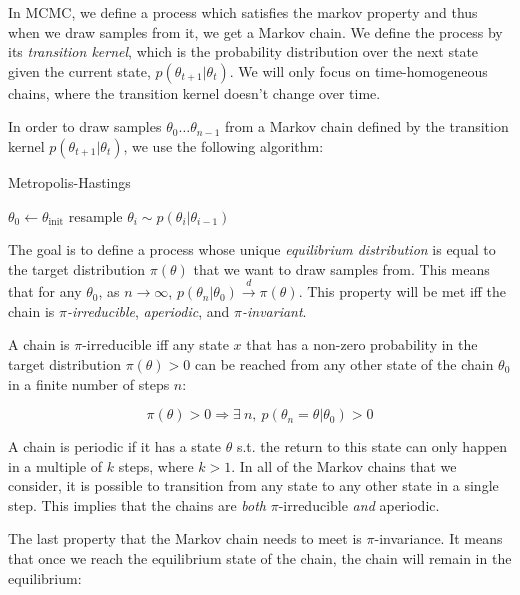 \documentclass[12pt]{article}
\begin{document}
{In MCMC, we define a process which satisfies the markov property and thus when we draw samples from it, we get a Markov chain. We define the process by its \textit{transition kernel}, which is the probability distribution over the next state given the current state, $p(\theta_{t+1}|\theta_t)$. We will only focus on time-homogeneous chains, where the transition kernel doesn't change over time.

In order to draw samples $\theta_0 \ldots \theta_{n-1}$ from a Markov chain defined by the transition kernel $p(\theta_{t+1}|\theta_t)$, we use the following algorithm:

\begin{algorithm}
\caption{Metropolis-Hastings}
\label{alg_mh}
\begin{algorithmic}
\State $\theta_0 \gets \theta_{\textrm{init}}$
	\State resample $\theta_i \sim p(\theta_i|\theta_{i-1})$
\EndFor
\end{algorithmic}
\end{algorithm}

The goal is to define a process whose unique \textit{equilibrium distribution} is equal to the target distribution $\pi(\theta)$ that we want to draw samples from. This means that for any $\theta_0$, as $n \rightarrow \infty$, $p(\theta_n|\theta_0) \xrightarrow{d} \pi(\theta)$. This property will be met iff the chain is \textit{$\pi$-irreducible}, \textit{aperiodic}, and \textit{$\pi$-invariant}.

A chain is $\pi$-irreducible iff any state $x$ that has a non-zero probability in the target distribution $\pi(\theta) > 0$ can be reached from any other state of the chain $\theta_0$ in a finite number of steps $n$:

\begin{equation}
\pi(\theta) > 0 \Rightarrow \exists \ n, \ p(\theta_n = \theta|\theta_0) > 0
\end{equation}

A chain is periodic if it has a state $\theta$ s.t. the return to this state can only happen in a multiple of $k$ steps, where $k > 1$. In all of the Markov chains that we consider, it is possible to transition from any state to any other state in a single step. This implies that the chains are \textit{both} $\pi$-irreducible \textit{and} aperiodic.

The last property that the Markov chain needs to meet is $\pi$-invariance. It means that once we reach the equilibrium state of the chain, the chain will remain in the equilibrium:

}
\end{document}
